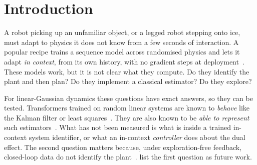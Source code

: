 \section{Introduction}\label{sec:intro}

A robot picking up an unfamiliar object, or a legged robot stepping onto ice, must adapt to physics it does not
know from a few seconds of interaction. A popular recipe trains a sequence model across randomised physics and lets it
adapt \emph{in context}, from its own history, with no gradient steps at deployment~\citep{kumar2021rma,duan2016rl2,forgione2023from,busetto2024one}.
These models work, but it is not clear what they compute. Do they identify the plant and then plan? Do they
implement a classical estimator? Do they explore?

For linear-Gaussian dynamics these questions have exact answers, so they can be tested. Transformers trained on
random linear systems are known to \emph{behave} like the Kalman filter or least
squares~\citep{balim2023can,akram2026transformers}. They are also known to be \emph{able to represent} such
estimators~\citep{goel2024can,cole2025incontext,vladarean2026learning}. What has not been measured is what is inside
a trained in-context system identifier, or what an in-context \emph{controller} does about the dual effect. The second
question matters because, under exploration-free feedback, closed-loop data do not identify the plant~\citep{feldbaum1960dual,astrom1995adaptive,ljung1999system}.
\citet{akram2026transformers} list the first question as future work.

